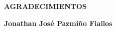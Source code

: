 \newpage
\vspace*{\fill}
\begin{flushright}
	\footnotesize
	\begin{minipage}{0.5\textwidth}
		\begin{flushright}
			\uppercase{\textbf{Agradecimientos}}
		\end{flushright}
		\itshape


		\bigbreak
		\begin{flushright}
			\textbf{Jonathan José Pazmiño Fiallos}
		\end{flushright}
	\end{minipage}
\end{flushright}
\vspace*{\fill}
